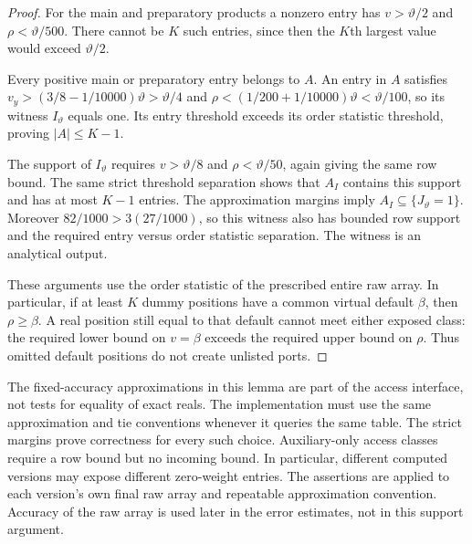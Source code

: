 \begin{proof}
For the main and preparatory products a nonzero entry has
$v>\vartheta/2$ and $\rho<\vartheta/500$.  There cannot be $K$ such
entries, since then the $K$th largest value would exceed $\vartheta/2$.

Every positive main or preparatory entry belongs to $A$.  An entry in
$A$ satisfies $v_y>(3/8-1/10000)\vartheta>\vartheta/4$ and
$\rho<(1/200+1/10000)\vartheta<\vartheta/100$, so its witness
$I_{\vartheta}$ equals one.  Its entry threshold exceeds its order statistic
threshold, proving $|A|\le K-1$.

The support of $I_{\vartheta}$ requires $v>\vartheta/8$ and
$\rho<\vartheta/50$, again giving the same row bound.  The same strict threshold separation shows that $A_I$
contains this support and has at most $K-1$ entries.
The approximation margins imply $A_I\subseteq\{J_{\vartheta}=1\}$.
Moreover $82/1000>3(27/1000)$, so this witness also has bounded row
support and the required entry versus order statistic separation.  The witness is
an analytical output.

These arguments use the order statistic of the prescribed entire raw array.
In particular, if at least $K$ dummy positions have a common virtual
default $\beta$, then $\rho\ge\beta$.  A real position still equal to
that default cannot meet either exposed class: the required lower bound
on $v=\beta$ exceeds the required upper bound on $\rho$.  Thus omitted
default positions do not create unlisted ports.
\end{proof}

The fixed-accuracy approximations in this lemma are part of the access
interface, not tests for equality of exact reals.  The implementation
must use the same approximation and tie conventions whenever it queries
the same table.  The strict margins prove correctness for every such
choice.  Auxiliary-only access classes require a row bound but no
incoming bound.
In particular, different computed versions may expose different
zero-weight entries.  The assertions are applied to each version's own
final raw array and repeatable approximation convention.  Accuracy of the raw array is used
later in the error estimates, not in this support argument.


